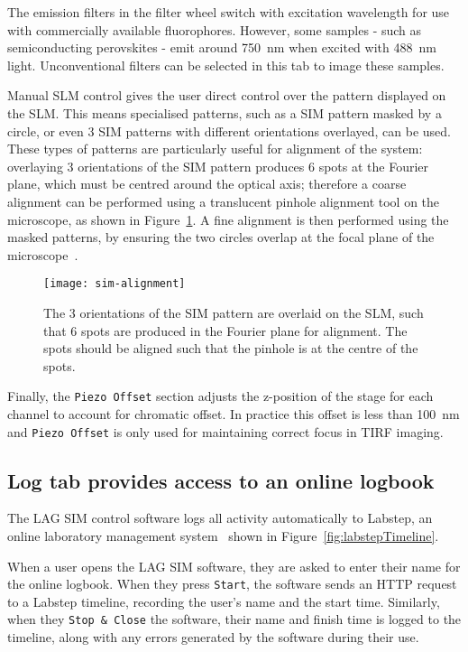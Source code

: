 The emission filters in the filter wheel switch with excitation wavelength for use with commercially available fluorophores.
However, some samples - such as semiconducting perovskites - emit around \SI{750}{\nano\metre} when excited with \SI{488}{\nano\metre} light.
Unconventional filters can be selected in this tab to image these samples.

Manual SLM control gives the user direct control over the pattern displayed on the SLM.
This means specialised patterns, such as a SIM pattern masked by a circle, or even 3 SIM patterns with different orientations overlayed, can be used.
These types of patterns are particularly useful for alignment of the system: overlaying 3 orientations of the SIM pattern produces 6 spots at the Fourier plane, which must be centred around the optical axis; therefore a coarse alignment can be performed using a translucent pinhole alignment tool on the microscope, as shown in Figure~\ref{fig:pinhole-alignment}.
A fine alignment is then performed using the masked patterns, by ensuring the two circles overlap at the focal plane of the microscope~\cite{young2016guide}.

\begin{figure}[htbp!]
\centering
\texttt{[image: sim-alignment]}
\caption[LAG SIM: Displaying specially designed patterns on the SLM assists with alignment of LAG SIM]{The 3 orientations of the SIM pattern are overlaid on the SLM, such that 6 spots are produced in the Fourier plane for alignment. The spots should be aligned such that the pinhole is at the centre of the spots.}
\label{fig:pinhole-alignment}
\end{figure}

Finally, the \texttt{Piezo Offset} section adjusts the z-position of the stage for each channel to account for chromatic offset.
In practice this offset is less than \SI{100}{\nano\meter} and \texttt{Piezo Offset} is only used for maintaining correct focus in TIRF imaging.

\subsection{Log tab provides access to an online logbook}
The LAG SIM control software logs all activity automatically to Labstep, an online laboratory management system~\cite{labstep} shown in Figure~\ref{fig:labstepTimeline}.

When a user opens the LAG SIM software, they are asked to enter their name for the online logbook.
When they press \texttt{Start}, the software sends an HTTP request to a Labstep timeline,  recording the user's name and the start time.
Similarly, when they \texttt{Stop \& Close} the software, their name and finish time is logged to the timeline, along with any errors generated by the software during their use.

